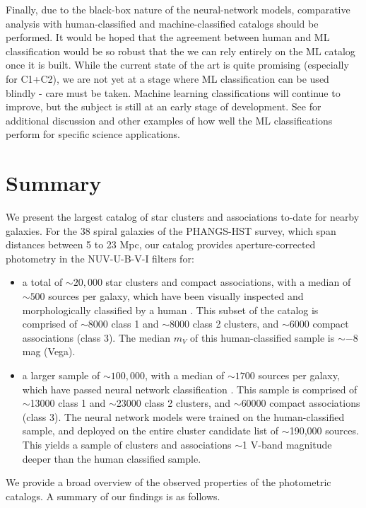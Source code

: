\documentclass[]{aastex631}
\begin{document}
Finally, due to the black-box nature of the neural-network models, comparative analysis with human-classified and machine-classified catalogs should be performed.
It would be hoped that the agreement between human and ML classification would be so robust that the we can rely entirely on the ML catalog once it is built. While the current state of the art is quite promising (especially for C1+C2), we are not yet at a stage where  ML classification can be used blindly - care  must be taken.
Machine learning classifications will continue to improve, but the subject is still at an early stage of development. See \citet{wei_deep_2020, whitmore_star_2021, perez_starcnet_2021, hannon_star_2023} for additional discussion and other examples of how well the ML classifications perform for specific science applications.


\section{Summary}\label{sect:summary}
We present the largest catalog of star clusters and associations to-date for nearby galaxies.  For the 38 spiral galaxies of the PHANGS-HST survey, which span distances between 5 to 23 Mpc, our catalog provides aperture-corrected photometry in the NUV-U-B-V-I filters for:
\begin{itemize}
    \item a total of $\sim20,000$ star clusters and compact associations, with a median of $\sim500$ sources per galaxy, which have been visually inspected and morphologically classified by a human \citep[co-author BCW,][]{whitmore_star_2021}.  This subset of the catalog is comprised of $\sim$8000 class 1 and $\sim$8000 class 2 clusters, and $\sim$6000 compact associations (class 3).  The median $m_V$ of this human-classified sample is $\sim-8$ mag (Vega).
    \item a larger sample of $\sim100,000$, with a median of $\sim1700$ sources per galaxy, which have passed neural network classification \citep{hannon_star_2023}.  This sample is comprised of $\sim$13000 class 1 and $\sim$23000 class 2 clusters, and $\sim$60000 compact associations (class 3).  The neural network models were trained on the human-classified sample, and deployed on the entire cluster candidate list of $\sim$190,000 sources. This yields a sample of clusters and associations $\sim$1 V-band magnitude deeper than the human classified sample.
\end{itemize}

We provide a broad overview of the observed properties of the photometric catalogs.  A summary of our findings is as follows.
\end{document}
